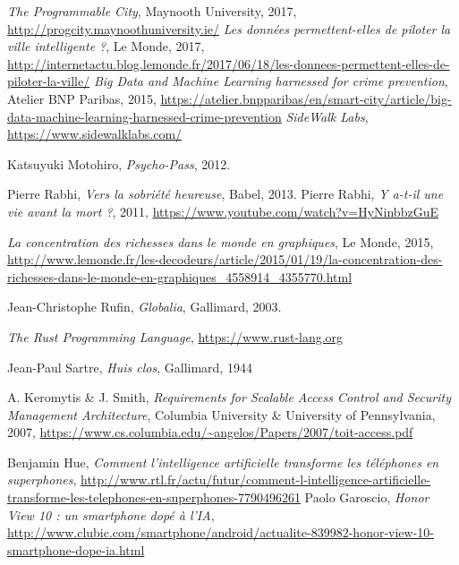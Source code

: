 \begin{thebibliography}{99}
     \emph{The Programmable City}, Maynooth University, 2017, \url{http://progcity.maynoothuniversity.ie/}
     \emph{Les données permettent-elles de piloter la ville intelligente ?}, Le Monde, 2017, \url{http://internetactu.blog.lemonde.fr/2017/06/18/les-donnees-permettent-elles-de-piloter-la-ville/}
     \emph{Big Data and Machine Learning harnessed for crime prevention}, Atelier BNP Paribas, 2015, \url{https://atelier.bnpparibas/en/smart-city/article/big-data-machine-learning-harnessed-crime-prevention}
     \emph{SideWalk Labs}, \url{https://www.sidewalklabs.com/}

     Katsuyuki Motohiro, \emph{Psycho-Pass}, 2012.

     Pierre Rabhi, \emph{Vers la sobriété heureuse}, Babel, 2013.
     Pierre Rabhi, \emph{Y a-t-il une vie avant la mort ?}, 2011, \url{https://www.youtube.com/watch?v=HyNinbbzGuE}

     \emph{La concentration des richesses dans le monde en graphiques}, Le Monde, 2015, \url{http://www.lemonde.fr/les-decodeurs/article/2015/01/19/la-concentration-des-richesses-dans-le-monde-en-graphiques_4558914_4355770.html}

     Jean-Christophe Rufin, \emph{Globalia}, Gallimard, 2003.

     \emph{The Rust Programming Language}, \url{https://www.rust-lang.org}

     Jean-Paul Sartre, \emph{Huis clos}, Gallimard, 1944
    
     A. Keromytis \& J. Smith, \emph{Requirements for Scalable Access Control and Security Management Architecture}, Columbia University \& University of Pennsylvania, 2007, \url{https://www.cs.columbia.edu/~angelos/Papers/2007/toit-access.pdf}

     Benjamin Hue, \emph{Comment l'intelligence artificielle transforme les téléphones en superphones}, \url{http://www.rtl.fr/actu/futur/comment-l-intelligence-artificielle-transforme-les-telephones-en-superphones-7790496261}
     Paolo Garoscio, \emph{Honor View 10 : un smartphone dopé à l'IA}, \url{http://www.clubic.com/smartphone/android/actualite-839982-honor-view-10-smartphone-dope-ia.html}


\end{thebibliography}
